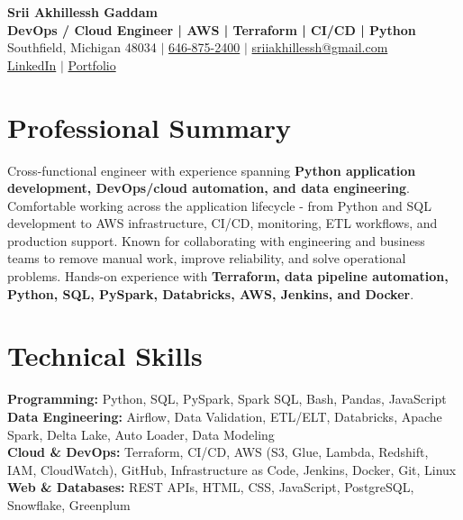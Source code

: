 \documentclass[letterpaper,10pt]{article}
\begin{document}
\fontsize{9.35pt}{10.45pt}\selectfont

\begin{center}
    {\LARGE \textbf{Srii Akhillessh Gaddam}} \\[-1pt]
    \textbf{DevOps / Cloud Engineer | AWS | Terraform | CI/CD | Python} \\[2pt]
    Southfield, Michigan 48034 $|$
    \href{tel:6468752400}{646-875-2400} $|$
    \href{mailto:sriiakhillessh@gmail.com}{sriiakhillessh@gmail.com} \\[1pt]
    \href{https://www.linkedin.com/in/srii-akhiilessh-gaddam-b48668191/}{LinkedIn} $|$
    \href{https://sriiakhillesshg.github.io/portfolio/}{Portfolio}
\end{center}
\vspace{-8pt}

\section{Professional Summary}
\small{Cross-functional engineer with experience spanning \textbf{Python application development, DevOps/cloud automation, and data engineering}. Comfortable working across the application lifecycle - from Python and SQL development to AWS infrastructure, CI/CD, monitoring, ETL workflows, and production support. Known for collaborating with engineering and business teams to remove manual work, improve reliability, and solve operational problems. Hands-on experience with \textbf{Terraform, data pipeline automation, Python, SQL, PySpark, Databricks, AWS, Jenkins, and Docker}.}

\section{Technical Skills}
\small{
\textbf{Programming:} Python, SQL, PySpark, Spark SQL, Bash, Pandas, JavaScript \\
\textbf{Data Engineering:} Airflow, Data Validation, ETL/ELT, Databricks, Apache Spark, Delta Lake, Auto Loader, Data Modeling \\
\textbf{Cloud \& DevOps:} Terraform, CI/CD, AWS (S3, Glue, Lambda, Redshift, IAM, CloudWatch), GitHub, Infrastructure as Code, Jenkins, Docker, Git, Linux \\
\textbf{Web \& Databases:} REST APIs, HTML, CSS, JavaScript, PostgreSQL, Snowflake, Greenplum
}
\end{document}
